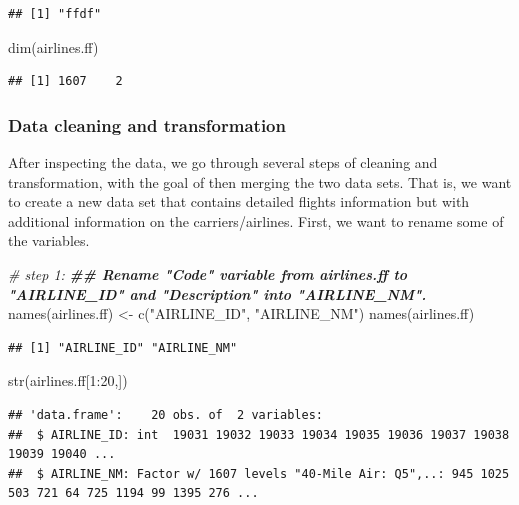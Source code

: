 \documentclass[
  12pt,
]{style/krantz}
\newenvironment{Shaded}{\begin{snugshade}}{\end{snugshade}}
\newcommand{\CommentTok}[1]{\textcolor[rgb]{0.56,0.35,0.01}{\textit{#1}}}
\newcommand{\DecValTok}[1]{\textcolor[rgb]{0.00,0.00,0.81}{#1}}
\newcommand{\DocumentationTok}[1]{\textcolor[rgb]{0.56,0.35,0.01}{\textbf{\textit{#1}}}}
\newcommand{\FunctionTok}[1]{\textcolor[rgb]{0.00,0.00,0.00}{#1}}
\newcommand{\NormalTok}[1]{#1}
\newcommand{\OtherTok}[1]{\textcolor[rgb]{0.56,0.35,0.01}{#1}}
\newcommand{\SpecialCharTok}[1]{\textcolor[rgb]{0.00,0.00,0.00}{#1}}
\newcommand{\StringTok}[1]{\textcolor[rgb]{0.31,0.60,0.02}{#1}}
\begin{document}
\begin{verbatim}
## [1] "ffdf"
\end{verbatim}

\begin{Shaded}
\begin{Highlighting}[]
\FunctionTok{dim}\NormalTok{(airlines.ff)}
\end{Highlighting}
\end{Shaded}

\begin{verbatim}
## [1] 1607    2
\end{verbatim}

\hypertarget{data-cleaning-and-transformation}{%
\subsubsection{Data cleaning and transformation}\label{data-cleaning-and-transformation}}

After inspecting the data, we go through several steps of cleaning and transformation, with the goal of then merging the two data sets. That is, we want to create a new data set that contains detailed flights information but with additional information on the carriers/airlines. First, we want to rename some of the variables.

\begin{Shaded}
\begin{Highlighting}[]
\CommentTok{\# step 1: }
\DocumentationTok{\#\# Rename "Code" variable from airlines.ff to "AIRLINE\_ID" and "Description" into "AIRLINE\_NM".}
\FunctionTok{names}\NormalTok{(airlines.ff) }\OtherTok{\textless{}{-}} \FunctionTok{c}\NormalTok{(}\StringTok{"AIRLINE\_ID"}\NormalTok{, }\StringTok{"AIRLINE\_NM"}\NormalTok{)}
\FunctionTok{names}\NormalTok{(airlines.ff)}
\end{Highlighting}
\end{Shaded}

\begin{verbatim}
## [1] "AIRLINE_ID" "AIRLINE_NM"
\end{verbatim}

\begin{Shaded}
\begin{Highlighting}[]
\FunctionTok{str}\NormalTok{(airlines.ff[}\DecValTok{1}\SpecialCharTok{:}\DecValTok{20}\NormalTok{,])}
\end{Highlighting}
\end{Shaded}

\begin{verbatim}
## 'data.frame':    20 obs. of  2 variables:
##  $ AIRLINE_ID: int  19031 19032 19033 19034 19035 19036 19037 19038 19039 19040 ...
##  $ AIRLINE_NM: Factor w/ 1607 levels "40-Mile Air: Q5",..: 945 1025 503 721 64 725 1194 99 1395 276 ...
\end{verbatim}
\end{document}
